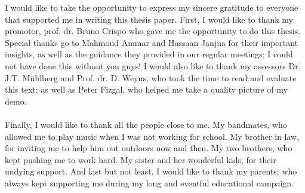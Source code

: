 \documentclass[master=cws,masteroption=vs,english,extralanguage=dutch]{kulemt}
\begin{document}
	
\begin{preface} 
I would like to take the opportunity to express my sincere gratitude to everyone that supported me in writing this thesis paper. First, I would like to thank my promotor, prof. dr. Bruno Crispo who gave me the opportunity to do this thesis. Special thanks go to Mahmoud Ammar and Hassaan Janjua for their important insights, as well as the guidance they provided in our regular meetings; I could not have done this without you guys! I would also like to thank my assessors Dr. J.T. M\"{u}hlberg and Prof. dr. D. Weyns, who took the time to read and evaluate this text; as well as Peter Fizgal, who helped me take a quality picture of my demo. \\ \\ Finally, I would like to thank all the people close to me. My bandmates, who allowed me to play music when I was not working for school. My brother in law, for inviting me to help him out outdoors now and then. My two brothers, who kept pushing me to work hard. My sister and her wonderful kids, for their undying support. And last but not least, I would like to thank my parents; who always kept supporting me during my long and eventful educational campaign.
\end{preface}
	
\tableofcontents*
\end{document}
